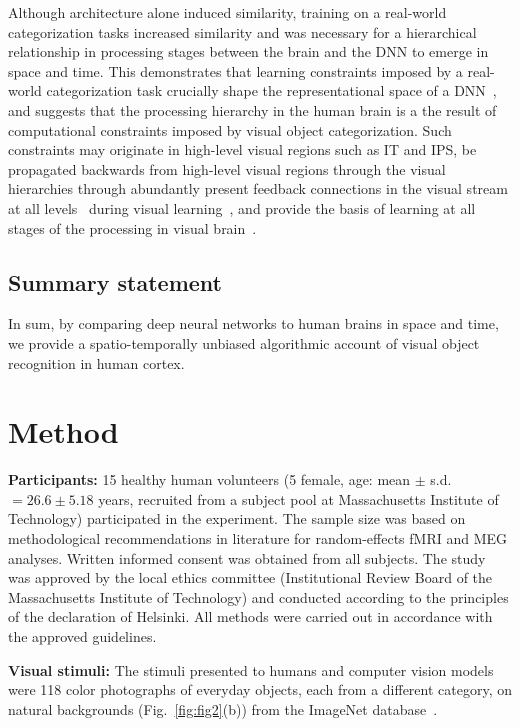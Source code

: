 \documentclass[10pt,twocolumn,letterpaper]{article}
\begin{document}
Although architecture alone induced similarity, training on a real-world categorization tasks increased similarity and was necessary for a hierarchical relationship in processing stages between the brain and the DNN to emerge in space and time. This demonstrates that learning constraints imposed by a real-world categorization task crucially shape the representational space of a DNN~\cite{yamins2014performance}, and suggests that the processing hierarchy in the human brain is a the result of computational constraints imposed by visual object categorization. Such constraints may originate in high-level visual regions such as IT and IPS, be propagated backwards from high-level visual regions through the visual hierarchies through abundantly present feedback connections in the visual stream at all levels~\cite{van1994multiple} during visual learning~\cite{ahissar2004reverse}, and provide the basis of learning at all stages of the processing in visual brain~\cite{kourtzi2006learning}.

\subsection{Summary statement}
In sum, by comparing deep neural networks to human brains in space and time, we provide a spatio-temporally unbiased algorithmic account of visual object recognition in human cortex.

\section{Method}
\textbf{Participants:} 
15 healthy human volunteers (5 female, age: mean $\pm$ s.d. $= 26.6 \pm 5.18$ years, recruited from a subject pool at Massachusetts Institute of Technology) participated in the experiment. The sample size was based on methodological recommendations in literature for random-effects fMRI and MEG analyses. Written informed consent was obtained from all subjects. The study was approved by the local ethics committee (Institutional Review Board of the Massachusetts Institute of Technology) and conducted according to the principles of the declaration of Helsinki. All methods were carried out in accordance with the approved guidelines.

\textbf{Visual stimuli:}
The stimuli presented to humans and computer vision models were 118 color photographs of everyday objects, each from a different category, on natural backgrounds (Fig.~\ref{fig:fig2}(b)) from the ImageNet database~\cite{deng2009imagenet}.
\end{document}
